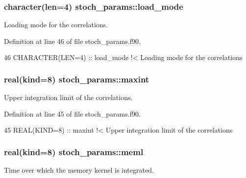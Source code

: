 \subsubsection[{\texorpdfstring{load\+\_\+mode}{load_mode}}]{\setlength{\rightskip}{0pt plus 5cm}character(len=4) stoch\+\_\+params\+::load\+\_\+mode}\hypertarget{namespacestoch__params_ac61a48744a1bb015b5148c421837fbe7}{}\label{namespacestoch__params_ac61a48744a1bb015b5148c421837fbe7}


Loading mode for the correlations. 



Definition at line 46 of file stoch\+\_\+params.\+f90.


\begin{DoxyCode}
46   \textcolor{keywordtype}{CHARACTER(LEN=4)} :: load\_mode\textcolor{comment}{      !< Loading mode for the correlations}
\end{DoxyCode}
\subsubsection[{\texorpdfstring{maxint}{maxint}}]{\setlength{\rightskip}{0pt plus 5cm}real(kind=8) stoch\+\_\+params\+::maxint}\hypertarget{namespacestoch__params_a50976593e79387f25e08fef6ce56b30b}{}\label{namespacestoch__params_a50976593e79387f25e08fef6ce56b30b}


Upper integration limit of the correlations. 



Definition at line 45 of file stoch\+\_\+params.\+f90.


\begin{DoxyCode}
45   \textcolor{keywordtype}{REAL(KIND=8)} :: maxint\textcolor{comment}{             !< Upper integration limit of the correlations}
\end{DoxyCode}
\subsubsection[{\texorpdfstring{meml}{meml}}]{\setlength{\rightskip}{0pt plus 5cm}real(kind=8) stoch\+\_\+params\+::meml}\hypertarget{namespacestoch__params_a6de8fcb6d516d431ddc0285e0c296eb7}{}\label{namespacestoch__params_a6de8fcb6d516d431ddc0285e0c296eb7}


Time over which the memory kernel is integrated. 



